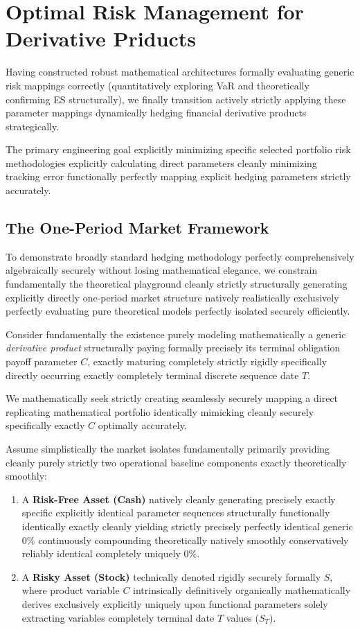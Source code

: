 \chapter{Optimal Risk Management for Derivative Priducts}

Having constructed robust mathematical architectures formally evaluating generic risk mappings correctly (quantitatively exploring VaR and theoretically confirming ES structurally), we finally transition actively strictly applying these parameter mappings dynamically hedging financial derivative products strategically.

The primary engineering goal explicitly minimizing specific selected portfolio risk methodologies explicitly calculating direct parameters cleanly minimizing tracking error functionally perfectly mapping explicit hedging parameters strictly accurately.

\section{The One-Period Market Framework}

To demonstrate broadly standard hedging methodology perfectly comprehensively algebraically securely without losing mathematical elegance, we constrain fundamentally the theoretical playground cleanly strictly structurally generating explicitly directly one-period market structure natively realistically exclusively perfectly evaluating pure theoretical models perfectly isolated securely efficiently.

Consider fundamentally the existence purely modeling mathematically a generic \textit{derivative product} structurally paying formally precisely its terminal obligation payoff parameter $C$, exactly maturing completely strictly rigidly specifically directly occurring exactly completely terminal discrete sequence date $T$. 

We mathematically seek strictly creating seamlessly securely mapping a direct replicating mathematical portfolio identically mimicking cleanly securely specifically exactly $C$ optimally accurately.

Assume simplistically the market isolates fundamentally primarily providing cleanly purely strictly two operational baseline components exactly theoretically smoothly:
\begin{enumerate}
    \item A \textbf{Risk-Free Asset (Cash)} natively cleanly generating precisely exactly specific explicitly identical parameter sequences structurally functionally identically exactly cleanly yielding strictly precisely perfectly identical generic $0\%$ continuously compounding theoretically natively smoothly conservatively reliably identical completely uniquely $0\%$.
    \item A \textbf{Risky Asset (Stock)} technically denoted rigidly securely formally $S$, where product variable $C$ intrinsically definitively organically mathematically derives exclusively explicitly uniquely upon functional parameters solely extracting variables completely terminal date $T$ values ($S_T$).
\end{enumerate}

